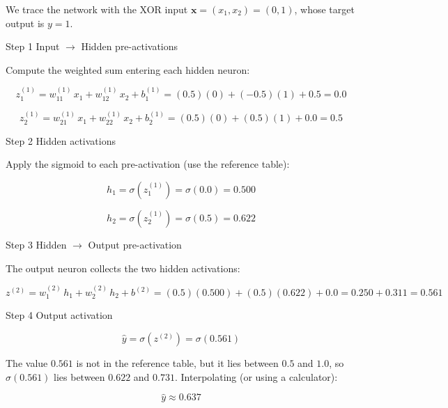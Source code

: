 \documentclass[12pt, a4paper]{article}
\newif\ifstudentmode
\newcommand{\sol}[2][6cm]{%
  \ifstudentmode
    \underline{\hspace{#1}}%
  \else
    {#2}%
  \fi
}
\theoremstyle{definition}
\newcommand{\yhat}{\hat{y}}
\newcommand{\sigmoid}{\sigma}
\newcommand{\bx}{\mathbf{x}}
\begin{document}
We trace the network with the XOR input $\bx = (x_1, x_2) = (0, 1)$,
whose target output is $y = 1$.

\begin{stepbox}{Step 1 \quad Input $\to$ Hidden pre-activations}

Compute the weighted sum entering each hidden neuron:

\[
  z^{(1)}_1
  = w^{(1)}_{11}\,x_1 + w^{(1)}_{12}\,x_2 + b^{(1)}_1
  = (0.5)(0) + (-0.5)(1) + 0.5
  = \sol[3cm]{0.0}
\]

\[
  z^{(1)}_2
  = w^{(1)}_{21}\,x_1 + w^{(1)}_{22}\,x_2 + b^{(1)}_2
  = (0.5)(0) + (0.5)(1) + 0.0
  = \sol[3cm]{0.5}
\]
\end{stepbox}

\vspace{0.8em}

\begin{stepbox}{Step 2 \quad Hidden activations}

Apply the sigmoid to each pre-activation (use the reference table):

\[
  h_1 = \sigmoid\!\left(z^{(1)}_1\right) = \sigmoid(0.0) = \sol[3cm]{0.500}
\]

\[
  h_2 = \sigmoid\!\left(z^{(1)}_2\right) = \sigmoid(0.5) = \sol[3cm]{0.622}
\]
\end{stepbox}

\vspace{0.8em}

\begin{stepbox}{Step 3 \quad Hidden $\to$ Output pre-activation}

The output neuron collects the two hidden activations:

\[
  z^{(2)}
  = w^{(2)}_1\,h_1 + w^{(2)}_2\,h_2 + b^{(2)}
  = (0.5)(0.500) + (0.5)(0.622) + 0.0
  = 0.250 + 0.311
  = \sol[3cm]{0.561}
\]
\end{stepbox}

\vspace{0.8em}

\begin{stepbox}{Step 4 \quad Output activation}

\[
  \yhat = \sigmoid\!\left(z^{(2)}\right) = \sigmoid(0.561)
\]

The value $0.561$ is not in the reference table, but it lies between $0.5$
and $1.0$, so $\sigmoid(0.561)$ lies between $0.622$ and $0.731$.
Interpolating (or using a calculator):

\[
  \yhat \approx \sol[3cm]{0.637}
\]
\end{stepbox}
\end{document}
